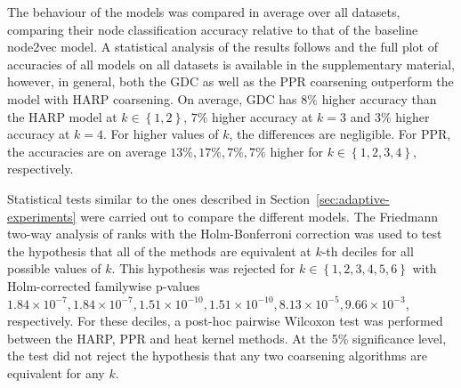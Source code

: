 The behaviour of the models was compared in average over all datasets, comparing their node classification accuracy relative to that of the baseline node2vec model. A statistical analysis of the results follows and the full plot of accuracies of all models on all datasets is available in the supplementary material, however, in general, both the GDC as well as the PPR coarsening outperform the model with  HARP coarsening. On average, GDC has \( 8\% \) higher accuracy than the HARP model at \( k \in \left\{ 1, 2 \right\} \), \( 7\% \) higher accuracy at \( k = 3 \) and \( 3\% \) higher accuracy at \( k = 4 \). For higher values of \( k \), the differences are negligible. For PPR, the accuracies are on average \( 13\%, 17\%, 7\%, 7\% \) higher for \( k \in \left\{ 1, 2, 3, 4 \right\} \), respectively.

Statistical tests similar to the ones described in Section~\ref{sec:adaptive-experiments} were carried out to compare the different models. The Friedmann two-way analysis of ranks with the Holm-Bonferroni correction was used to test the hypothesis that all of the methods are equivalent at \( k \)-th deciles for all possible values of \( k \). This hypothesis was rejected for \( k \in \left\{ 1, 2, 3, 4, 5, 6 \right\} \) with Holm-corrected familywise p-values \( 1.84 \times 10^{-7}, 1.84 \times 10^{-7}, 1.51 \times 10^{-10}, 1.51 \times 10^{-10}, 8.13 \times 10^{-5}, 9.66 \times 10^{-3} \), respectively. For these deciles, a post-hoc pairwise Wilcoxon test was performed between the HARP, PPR and heat kernel methods. At the 5\% significance level, the test did not reject the hypothesis that any two coarsening algorithms are equivalent for any \( k \).

